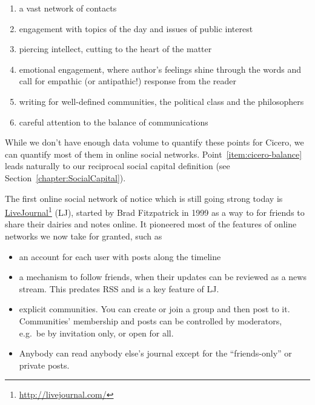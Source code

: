 \documentclass[10pt,oneside]{memoir}
\begin{document}
\begin{enumerate}


\item a vast network of contacts

\item engagement with topics of the day and issues of public interest

\item piercing intellect, cutting to the heart of the matter

\item emotional engagement, where author's feelings shine through the words and call for empathic (or antipathic!) response from the reader

\item writing for well-defined communities, the political class and the philosophers

\item \label{item:cicero-balance} careful attention to the balance of communications
\end{enumerate}

While we don't have enough data volume to quantify these points for Cicero, we can quantify most of them in online social networks.  Point~\ref{item:cicero-balance} leads naturally to our reciprocal social capital definition (see Section~\ref{chapter:SocialCapital}).


The first online social network of notice which is still going strong today is \href{http://livejournal.com/}{LiveJournal}\footnote{\href{http://livejournal.com/}{http://livejournal.com/}} (LJ), started by Brad Fitzpatrick in 1999 as a way to for friends to share their dairies and notes online.  It pioneered most of the features of online networks we now take for granted, such as


\begin{itemize}


\item an account for each user with posts along the timeline

\item a mechanism to follow friends, when their updates can be reviewed as a news stream. This predates RSS and is a key feature of LJ.

\item explicit communities. You can create or join a group and then post to it. Communities' membership and posts can be controlled by moderators, e.g.\ be by invitation only, or open for all.

\item Anybody can read anybody else's journal except for the ``friends-only'' or private posts.
\end{itemize}
\end{document}

